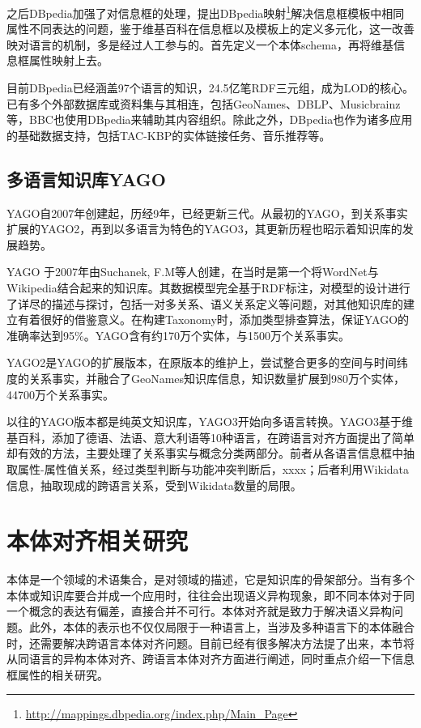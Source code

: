 之后DBpedia加强了对信息框的处理，提出DBpedia映射\footnote{\url{http://mappings.dbpedia.org/index.php/Main_Page}}解决信息框模板中相同属性不同表达的问题，鉴于维基百科在信息框以及模板上的定义多元化，这一改善映对语言的机制，多是经过人工参与的。首先定义一个本体schema，再将维基信息框属性映射上去\cite{mendes2012dbpedia}。

目前DBpedia已经涵盖97个语言的知识，24.5亿笔RDF三元组，成为LOD的核心。已有多个外部数据库或资料集与其相连，包括GeoNames、DBLP、Musicbrainz等，BBC也使用DBpedia来辅助其内容组织。除此之外，DBpedia也作为诸多应用的基础数据支持，包括TAC-KBP\cite{mendes2011evaluating}的实体链接任务、音乐推荐\cite{passant2010dbrec}等。

\subsection{多语言知识库YAGO}
YAGO自2007年创建起，历经9年，已经更新三代。从最初的YAGO\cite{suchanek2007yago,suchanek2008yago}，到关系事实扩展的YAGO2\cite{hoffart2013yago2}，再到以多语言为特色的YAGO3\cite{mahdisoltani2014yago3}，其更新历程也昭示着知识库的发展趋势。

{\heiti YAGO} 于2007年由Suchanek, F.M等人创建，在当时是第一个将WordNet\cite{fellbaum1998wordnet}与Wikipedia结合起来的知识库。其数据模型完全基于RDF标注，对模型的设计进行了详尽的描述与探讨，包括一对多关系、语义关系定义等问题，对其他知识库的建立有着很好的借鉴意义。在构建Taxonomy时，添加类型排查算法，保证YAGO的准确率达到95\%。YAGO含有约170万个实体，与1500万个关系事实。

{\heiti YAGO2}是YAGO的扩展版本，在原版本的维护上，尝试整合更多的空间与时间纬度的关系事实，并融合了GeoNames知识库信息，知识数量扩展到980万个实体，44700万个关系事实。

以往的YAGO版本都是纯英文知识库，{\heiti YAGO3}开始向多语言转换。YAGO3基于维基百科，添加了德语、法语、意大利语等10种语言，在跨语言对齐方面提出了简单却有效的方法，主要处理了关系事实与概念分类两部分。前者从各语言信息框中抽取属性-属性值关系，经过类型判断与功能冲突判断后，xxxx；后者利用Wikidata信息，抽取现成的跨语言关系，受到Wikidata数量的局限。

\section{本体对齐相关研究}

本体是一个领域的术语集合，是对领域的描述，它是知识库的骨架部分。当有多个本体或知识库要合并成一个应用时，往往会出现{\heiti 语义异构}现象，即不同本体对于同一个概念的表达有偏差，直接合并不可行。本体对齐就是致力于解决语义异构问题。此外，本体的表示也不仅仅局限于一种语言上，当涉及多种语言下的本体融合时，还需要解决跨语言本体对齐问题。目前已经有很多解决方法提了出来，本节将从同语言的异构本体对齐、跨语言本体对齐方面进行阐述，同时重点介绍一下信息框属性的相关研究。


